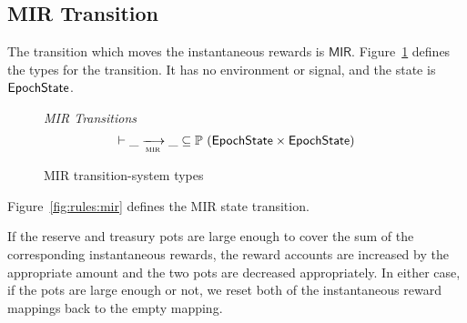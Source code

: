 \clearpage

\subsection{MIR Transition}
\label{sec:mir-trans}

The transition which moves the instantaneous rewards is $\mathsf{MIR}$.
Figure~\ref{fig:ts-types:mir} defines the types for the transition.
It has no environment or signal, and the state is $\mathsf{EpochState}$.

\begin{figure}
  \emph{MIR Transitions}
  \begin{equation*}
    \vdash \var{\_} \trans{mir}{} \var{\_} \subseteq
    \powerset (\EpochState \times \EpochState)
  \end{equation*}
  \caption{MIR transition-system types}
  \label{fig:ts-types:mir}
\end{figure}

Figure~\ref{fig:rules:mir} defines the MIR state transition.

If the reserve and treasury pots are large enough to cover the sum
of the corresponding instantaneous rewards,
the reward accounts are increased by the appropriate amount
and the two pots are decreased appropriately.
In either case, if the pots are large enough or not,
we reset both of the instantaneous reward mappings back to the empty mapping.

